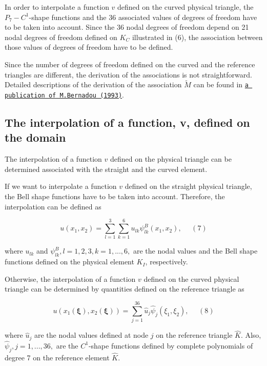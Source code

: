 In order to interpolate a function $ v $ defined on the curved physical triangle, the $P_7-C^1$-\/shape functions and the 36 associated values of degrees of freedom have to be taken into account. Since the 36 nodal degrees of freedom depend on 21 nodal degrees of freedom defined on $K_C$ illustrated in (6), the association between those values of degrees of freedom have to be defined.

Since the number of degrees of freedom defined on the curved and the reference triangles are different, the derivation of the associations is not straightforward. Detailed descriptions of the derivation of the association $ \tilde{M} $ can be found in \href{http://www.sciencedirect.com/science?_ob=MiamiImageURL&_cid=271868&_user=6991156&_pii=004578259390111A&_check=y&_origin=article&_zone=toolbar&_coverDate=31-Jan-1993&view=c&originContentFamily=serial&wchp=dGLzVlV-zSkzk&md5=d038a1aec18c25806e39c26187c2a200&pid=1-s2.0-004578259390111A-main.pdf}{\tt a publication of M.\+Bernadou (1993)}.



\hypertarget{index_intp}{}\subsection{The interpolation of a function, v, defined on the domain}\label{index_intp}
The interpolation of a function $ v $ defined on the physical triangle can be determined associated with the straight and the curved element.

If we want to interpolate a function $ v $ defined on the straight physical triangle, the Bell shape functions have to be taken into account. Therefore, the interpolation can be defined as

\[ u(x_1,x_2) = \sum_{l=1}^{3}\sum_{k=1}^{6} u_{lk}\psi^{B}_{lk}(x_{1},x_{2}), \ \ \ \ \ \ (7) \]

where $ u_{lk} $ and $ \psi^{B}_{lk}, l=1,2,3, k=1,...,6, $ are the nodal values and the Bell shape functions defined on the physical element $ K_I $, respectively.

Otherwise, the interpolation of a function $ v $ defined on the curved physical triangle can be determined by quantities defined on the reference triangle as

\[ u(x_1(\mathbf{\xi}),x_2(\mathbf{\xi})) = \sum_{j=1}^{36}{\hat{u}_{j}\hat{\psi}_{j}}(\xi_{1},\xi_{2}), \ \ \ \ \ \ (8)\]

where $ \hat{u}_{j} $ are the nodal values defined at node $j$ on the reference triangle $ \hat{K} $. Also, $ \hat{\psi}_{j}, j=1,...,36, $ are the $ C^1 $-\/shape functions defined by complete polynomials of degree 7 on the reference element $ \hat{K} $.

